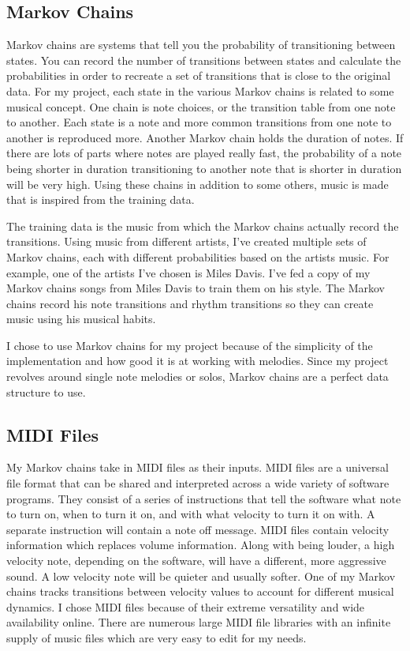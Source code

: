 \documentclass[10pt,twocolumn]{article}
\begin{document}
    \subsection{Markov Chains}
        Markov chains are systems that tell you the probability of transitioning between states. You can record the number of transitions between states and calculate the probabilities in order to recreate a set of transitions that is close to the original data\cite{Markov}. For my project, each state in the various Markov chains is related to some musical concept. One chain is note choices, or the transition table from one note to another. Each state is a note and more common transitions from one note to another is reproduced more. Another Markov chain holds the duration of notes. If there are lots of parts where notes are played really fast, the probability of a note being shorter in duration transitioning to another note that is shorter in duration will be very high. Using these chains in addition to some others, music is made that is inspired from the training data.\newline
        
        The training data is the music from which the Markov chains actually record the transitions. Using music from different artists, I've created multiple sets of Markov chains, each with different probabilities based on the artists music. For example, one of the artists I've chosen is Miles Davis. I've fed a copy of my Markov chains songs from Miles Davis to train them on his style. The Markov chains record his note transitions and rhythm transitions so they can create music using his musical habits.\newline
        
        I chose to use Markov chains for my project because of the simplicity of the implementation and how good it is at working with melodies. Since my project revolves around single note melodies or solos, Markov chains are a perfect data structure to use.

    \subsection{MIDI Files}
        My Markov chains take in MIDI files as their inputs. MIDI files are a universal file format that can be shared and interpreted across a wide variety of software programs. They consist of a series of instructions that tell the software what note to turn on, when to turn it on, and with what velocity to turn it on with. A separate instruction will contain a note off message. MIDI files contain velocity information which replaces volume information. Along with being louder, a high velocity note, depending on the software, will have a different, more aggressive sound. A low velocity note will be quieter and usually softer. One of my Markov chains tracks transitions between velocity values to account for different musical dynamics. I chose MIDI files because of their extreme versatility and wide availability online. There are numerous large MIDI file libraries with an infinite supply of music files which are very easy to edit for my needs.
        
\end{document}
